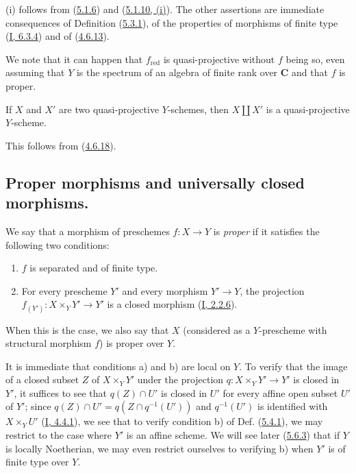 (i) follows from (\hyperref[II.5.1.6]{5.1.6}) and
(\hyperref[II.5.1.10]{5.1.10, (i)}). The other assertions are immediate
consequences of Definition (\hyperref[II.5.3.1]{5.3.1}), of the properties
of morphisms of finite type (\hyperref[I.6.3.4]{I, 6.3.4}) and of
(\hyperref[II.4.6.13]{4.6.13}).

\begin{remark}[5.3.5]
\label{II.5.3.5}
We note that it can happen that $f_{\mathrm{red}}$ is quasi-projective
without $f$ being so, even assuming that $Y$ is the spectrum of an algebra
of finite rank over $\mathbf{C}$ and that $f$ is proper.
\end{remark}

\begin{corollary}[5.3.6]
\label{II.5.3.6}
If $X$ and $X'$ are two quasi-projective $Y$-schemes, then $X\amalg X'$ is a
quasi-projective $Y$-scheme.
\end{corollary}

This follows from (\hyperref[II.4.6.18]{4.6.18}).

\subsection{Proper morphisms and universally closed morphisms.}
\label{subsection:II.5.4}
\label{II.5.4}

\begin{definition}[5.4.1]
\label{II.5.4.1}
We say that a morphism of preschemes $f:X\to Y$ is \emph{proper} if it
satisfies the following two conditions:
\begin{enumerate}
  \item[\rm{a)}] $f$ is separated and of finite type.
  \item[\rm{b)}] For every prescheme $Y'$ and every morphism $Y'\to Y$, the
  projection $f_{(Y')}:X\times_YY'\to Y'$ is a closed morphism
  (\hyperref[I.2.2.6]{I, 2.2.6}).
\end{enumerate}
When this is the case, we also say that $X$ (considered as a $Y$-prescheme
with structural morphism $f$) is proper over $Y$.
\end{definition}

It is immediate that conditions a) and b) are local on $Y$. To verify
that the image of a closed subset $Z$ of $X\times_YY'$ under the
projection $q:X\times_YY'\to Y'$ is closed in $Y'$, it suffices to see that
$q(Z)\cap U'$ is closed in $U'$ for every affine open subset $U'$ of $Y'$;
since $q(Z)\cap U'=q(Z\cap q^{-1}(U'))$ and $q^{-1}(U')$ is identified with
$X\times_YU'$ (\hyperref[I.4.4.1]{I, 4.4.1}), we see that to verify
condition b) of Def. (\hyperref[II.5.4.1]{5.4.1}), we may restrict to the
case where $Y'$ is an affine scheme. We will see later
(\hyperref[II.5.6.3]{5.6.3}) that if $Y$ is locally Noetherian, we
may even restrict ourselves to verifying b) when $Y'$ is of finite type over $Y$.

